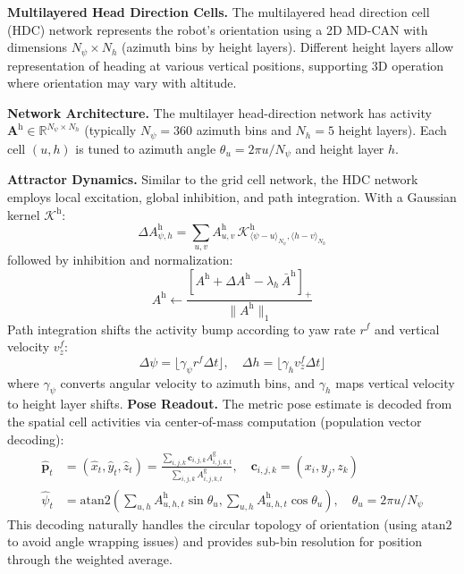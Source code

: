 \textbf{Multilayered Head Direction Cells.} The multilayered head direction cell (HDC) network represents the robot's orientation using a 2D MD-CAN with dimensions $N_\psi \times N_h$ (azimuth bins by height layers). Different height layers allow representation of heading at various vertical positions, supporting 3D operation where orientation may vary with altitude.

\textbf{Network Architecture.} The multilayer head-direction network has activity $\mathbf{A}^\mathrm{h} \in \mathbb{R}^{N_\psi \times N_h}$ (typically $N_\psi = 360$ azimuth bins and $N_h = 5$ height layers). Each cell $(u, h)$ is tuned to azimuth angle $\theta_u = 2\pi u / N_\psi$ and height layer $h$.

\textbf{Attractor Dynamics.} Similar to the grid cell network, the HDC network employs local excitation, global inhibition, and path integration. With a Gaussian kernel $\mathcal{K}^\mathrm{h}$:
\begin{equation}
    \Delta A^\mathrm{h}_{\psi,h}=\sum_{u,v}A^\mathrm{h}_{u,v}\,\mathcal{K}^\mathrm{h}_{\langle \psi-u\rangle_{N_\psi},\langle h-v\rangle_{N_h}}
\end{equation}
followed by inhibition and normalization:
\begin{equation}
    A^\mathrm{h}\leftarrow \frac{[A^\mathrm{h}+\Delta A^\mathrm{h}-\lambda_h\,\bar A^\mathrm{h}]_+}{\lVert A^\mathrm{h}\rVert_1}
\end{equation}
Path integration shifts the activity bump according to yaw rate $r^f$ and vertical velocity $v^f_z$:
\begin{equation}
    \Delta\psi=\lfloor \gamma_\psi r^f \Delta t\rfloor,\quad \Delta h=\lfloor \gamma_h v^f_z \Delta t\rfloor
\end{equation}
where $\gamma_\psi$ converts angular velocity to azimuth bins, and $\gamma_h$ maps vertical velocity to height layer shifts.
\textbf{Pose Readout.} The metric pose estimate is decoded from the spatial cell activities via center-of-mass computation (population vector decoding):
\begin{align}
    \hat{\mathbf{p}}_t & = ({\hat x}_t, {\hat y}_t, {\hat z}_t) = \frac{\sum_{i,j,k} \mathbf{c}_{i,j,k} A^\mathrm{g}_{i,j,k,t}}{\sum_{i,j,k} A^\mathrm{g}_{i,j,k,t}}, \quad \mathbf{c}_{i,j,k} = (x_i, y_j, z_k) \\
    \hat{\psi}_t       & = \mathrm{\mathrm{atan2}}\left(\sum_{u,h} A^\mathrm{h}_{u,h,t} \sin\theta_u, \sum_{u,h} A^\mathrm{h}_{u,h,t} \cos\theta_u\right), \quad \theta_u = 2\pi u / N_\psi
\end{align}
This decoding naturally handles the circular topology of orientation (using $\mathrm{\mathrm{atan2}}$ to avoid angle wrapping issues) and provides sub-bin resolution for position through the weighted average.

